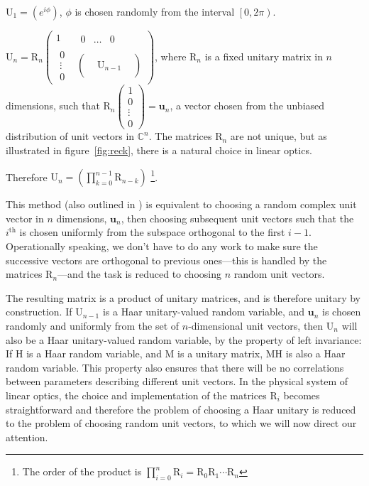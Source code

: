 \documentclass[aps,prl,twocolumn]{revtex4}
\renewcommand{\vec}[1]{\mathbf{#1}}
\newcommand{\mat}[1]{\mathrm{#1}}
\begin{document}
\(\mat{U}_1 = \left( e^{i \phi} \right)\), \(\phi\) is chosen randomly from the
interval \( \left[ 0, 2\pi \right) \).

\(\mat{U}_n = \mat{R}_n \begin{pmatrix}
  1 & \begin{matrix}
    0 & \dots & 0 \end{matrix} \\
  \begin{matrix}
    0 \\
    \vdots \\
    0 \end{matrix} &
  \begin{pmatrix}
    & & \\
    & \mat{U}_{n-1} & \\
    & & \end{pmatrix} \end{pmatrix} \),
where \(\mat{R}_{n}\) is a fixed unitary matrix in \(n\) dimensions, such
that \(\mat{R}_n \begin{pmatrix}
  1 \\
  0 \\
  \vdots \\
  0 \end{pmatrix} = \vec{u}_n\), a vector chosen from the unbiased
distribution of unit vectors in \(\mathbb{C}^n\). The matrices \(\mat{R}_n\) are
not unique, but as illustrated in figure~\ref{fig:reck}, there is a natural
choice in linear optics.

Therefore \(\mat{U}_n = \left( \displaystyle\prod_{k=0}^{n-1} \mat{R}_{n-k}
\right)\) \footnote{The order of the product is \( \prod_{i=0}^{n} \mat{R}_i =
\mat{R}_0 \mat{R}_1 \cdots \mat{R}_n \)}.

This method (also outlined in \cite{re-phd}) is equivalent to choosing a random
complex unit vector in \(n\) dimensions, \(\vec{u}_n\), then choosing subsequent
unit vectors such that the \(i^{\text{th}}\) is chosen uniformly from
the subspace orthogonal to the first \(i-1\). Operationally speaking, we don't
have to do any work to make sure the successive vectors are orthogonal to
previous ones---this is handled by the matrices \(\mat{R}_n\)---and the task
is reduced to choosing \(n\) random unit vectors.

The resulting matrix is a product of unitary matrices, and is therefore unitary
by construction. If \(\mat{U}_{n-1}\) is a Haar unitary-valued random variable,
and \(\vec{u}_{n}\) is chosen randomly and uniformly from the set of
\(n\)-dimensional unit vectors, then \(\mat{U}_n\) will also be a Haar
unitary-valued random variable, by the property of left invariance: If
\(\mat{H}\) is a Haar random variable, and \(\mat{M}\) is a unitary
matrix, \(\mat{MH}\) is also a Haar random variable. This property also ensures
that there will be no correlations between parameters describing different
unit vectors. In the physical system of
linear optics, the choice and implementation of the matrices \(\mat{R}_i\)
becomes straightforward \cite{re-prl-73-58} and therefore the problem of
choosing a Haar unitary is reduced to the problem of choosing random unit
vectors, to which we will now direct our attention.
\end{document}
